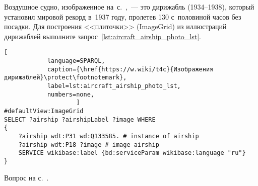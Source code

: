 %
\begin{task}
    \label{answer:aircraft_question_airship_2}
Воздушное судно, 
    изображенное на~с.~\pageref{fig:airship_question_aircraft},~--- 
    это дирижабль  (1934--1938), 
    который установил мировой рекорд в~1937 году, 
    пролетев 130 с~половиной часов без посадки.
    Для построения <<плиточки>> (ImageGrid) из иллюстраций дирижаблей 
    выполните запрос~\ref{lst:aircraft_airship_photo_lst}.
    
	\begin{lstlisting}[ 
            language=SPARQL, 
            caption={\href{https://w.wiki/t4c}{Изображения дирижаблей}\protect\footnotemark}, 
            label=lst:aircraft_airship_photo_lst, 
            numbers=none,
                    ]
#defaultView:ImageGrid
SELECT ?airship ?airshipLabel ?image WHERE
{
    ?airship wdt:P31 wd:Q133585. # instance of airship
  	?airship wdt:P18 ?image # image airship
    SERVICE wikibase:label {bd:serviceParam wikibase:language "ru"}
}
\end{lstlisting}
    
\small{\AnswerBackref Вопрос на с.~\pageref{fig:airship_question_aircraft}.}
\end{task}







\hfil{}\hfil%
\newpage

